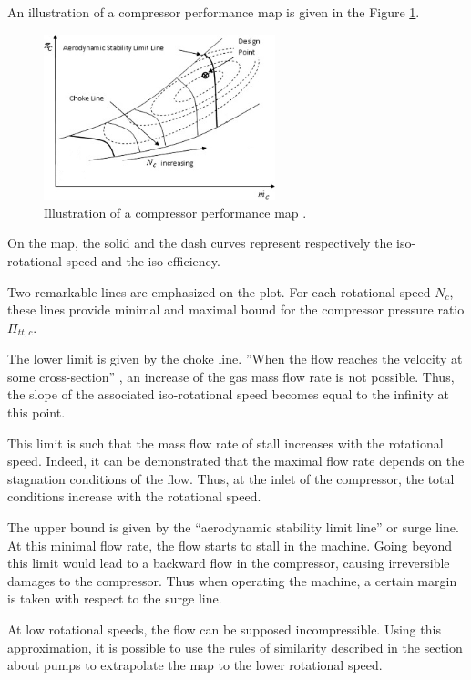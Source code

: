 An illustration of a compressor performance map is given in the Figure \ref{fig:C4_compmap}.
\begin{figure}[h]
    \centering
    \includegraphics[width=0.6\textwidth]{Comp_Map.png}
    \caption{Illustration of a compressor performance map \cite{Ghorbanian2009}.}
    \label{fig:C4_compmap}
\end{figure}

On the map, the solid and the dash curves represent respectively the iso-rotational speed and the iso-efficiency.

Two remarkable lines are emphasized on the plot. For each rotational speed \(N_c\), these lines provide minimal and maximal bound for the compressor pressure ratio \(\Pi_{tt,c}\).

The lower limit is given by the choke line. ''When the flow reaches the velocity at some cross-section'' \cite{Ghorbanian2009}, an increase of the gas mass flow rate is not possible. Thus, the slope of the associated iso-rotational speed becomes equal to the infinity at this point. 

This limit is such that the mass flow rate of stall increases with the rotational speed. Indeed, it can be demonstrated that the maximal flow rate depends on the stagnation conditions of the flow. Thus, at the inlet of the compressor, the total conditions increase with the rotational speed. 

The upper bound is given by the “aerodynamic stability limit line'' or surge line. At this minimal flow rate, the flow starts to stall in the machine. Going beyond this limit would lead to a backward flow in the compressor, causing irreversible damages to the compressor. Thus when operating the machine, a certain margin is taken with respect to the surge line.

At low rotational speeds, the flow can be supposed incompressible. Using this approximation, it is possible to use the rules of similarity described in the section about pumps to extrapolate the map to the lower rotational speed.

